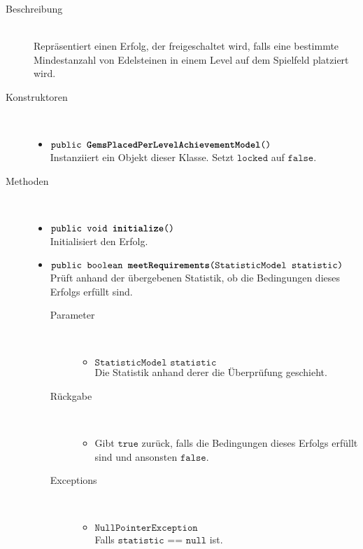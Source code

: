 		\begin{description}
		\item[Beschreibung] \hfill \\ Repräsentiert einen Erfolg, der freigeschaltet wird, falls eine bestimmte Mindestanzahl von Edelsteinen in einem Level auf dem Spielfeld platziert wird.
			
		\item[Konstruktoren] \hfill \\
			\vspace{-.8cm}
			\begin{itemize}
				\item $\texttt{public \textbf{GemsPlacedPerLevelAchievementModel}()}$ \\ Instanziiert ein Objekt dieser Klasse. Setzt $\texttt{locked}$ auf $\texttt{false}$.
			\end{itemize}
			
		\item[Methoden] \hfill \\
			\vspace{-.8cm}
			\begin{itemize}
						\item $\texttt{public void \textbf{initialize}()}$ \\ Initialisiert den Erfolg.
				
				\item $\texttt{public boolean \textbf{meetRequirements}(StatisticModel statistic)}$ \\ Prüft anhand der übergebenen Statistik, ob die Bedingungen dieses Erfolgs erfüllt sind.
				\begin{description}
				\item[Parameter] \hfill \\
					\vspace{-.8cm}
					\begin{itemize}
						\item $\texttt{StatisticModel statistic}$ \\ Die Statistik anhand derer die Überprüfung geschieht. 
					\end{itemize}
					\item[Rückgabe] \hfill \\
					\vspace{-.8cm}
					\begin{itemize}
						\item Gibt $\texttt{true}$ zurück, falls die Bedingungen dieses Erfolgs erfüllt sind und ansonsten $\texttt{false}$.
					\end{itemize}
					\item[Exceptions] \hfill \\
					\vspace{-.8cm}
					\begin{itemize}
						\item $\texttt{NullPointerException}$ \\ Falls $\texttt{statistic == null}$ ist.
					\end{itemize}
				\end{description}
			\end{itemize}
		\end{description}
		
